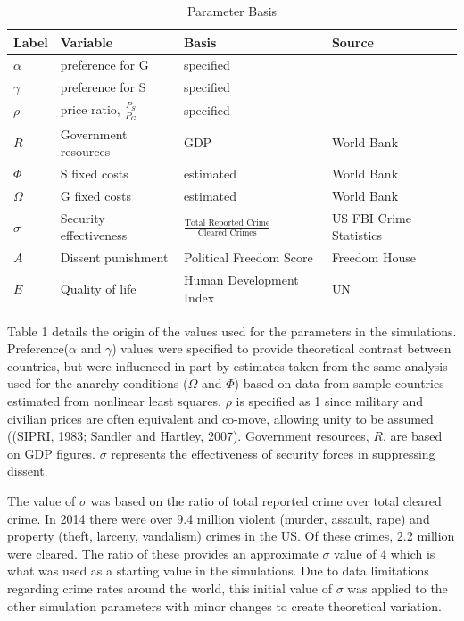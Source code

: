 \documentclass[12pt]{article}
\begin{document}
\begin{spacing}{1.5}
\begin{spacing}{1}
\begin{table}[]
\centering
\footnotesize
\begin{tabular}{llll}
\toprule
\textbf{Label} & \textbf{Variable} & \textbf{Basis} & \textbf{Source} \\ \hline
$\alpha$ & preference for G & specified &  \\
\textbf{$\gamma$} & preference for S & specified &  \\
$\rho$ & price ratio, $\frac{P_S}{P_G}$ & specified & \\
\textbf{$R$} & Government resources & GDP & World Bank \\
$\Phi$ & S fixed costs & estimated & World Bank \\
\textbf{$\Omega$} & G fixed costs & estimated & World Bank \\
\textbf{$\sigma$} & Security effectiveness & $\frac{\text{Total Reported Crime}}{\text{Cleared Crimes}}$ & US FBI Crime Statistics \\
\textbf{$A$} & Dissent punishment & Political Freedom Score & Freedom House \\
\textbf{$E$} & Quality of life & Human Development Index & UN \\ \hline
\end{tabular}
\caption{Parameter Basis}
\end{table}
\end{spacing}


Table 1 details the origin of the values used for the parameters in the simulations. Preference($\alpha$ and $\gamma$) values were specified to provide theoretical contrast between countries, but were influenced in part by estimates taken from the same analysis used for the anarchy conditions ($\Omega$ and $\Phi$) based on data from sample countries estimated from nonlinear least squares. $\rho$ is specified as 1 since military and civilian prices are often equivalent and co-move, allowing unity to be assumed ((SIPRI, 1983; Sandler and Hartley, 2007). Government resources, $R$, are based on GDP figures. $\sigma$ represents the effectiveness of security forces in suppressing dissent. 

The value of $\sigma$ was based on the ratio of total reported crime over total cleared crime. In 2014 there were over 9.4 million violent (murder, assault, rape) and property (theft, larceny, vandalism) crimes in the US. Of these crimes, 2.2 million were cleared. The ratio of these provides an approximate $\sigma$ value of 4 which is what was used as a starting value in the simulations. Due to data limitations regarding crime rates around the world, this initial value of $\sigma$ was applied to the other simulation parameters with minor changes to create theoretical variation. 



\end{spacing}
\end{document}

